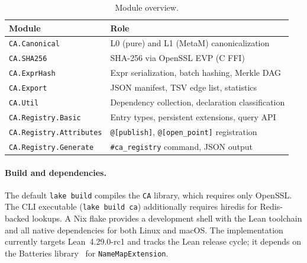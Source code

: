 \begin{table}[h]
\centering
\begin{tabular}{@{}ll@{}}
  \toprule
  \textbf{Module} & \textbf{Role} \\
  \midrule
  \texttt{CA.Canonical}           & L0 (pure) and L1 (MetaM) canonicalization \\
  \texttt{CA.SHA256}              & SHA-256 via OpenSSL EVP (C FFI) \\
  \texttt{CA.ExprHash}            & Expr serialization, batch hashing, Merkle DAG \\
  \texttt{CA.Export}              & JSON manifest, TSV edge list, statistics \\
  \texttt{CA.Util}                & Dependency collection, declaration classification \\
  \texttt{CA.Registry.Basic}      & Entry types, persistent extensions, query API \\
  \texttt{CA.Registry.Attributes} & \texttt{@[publish]}, \texttt{@[open\_point]} registration \\
  \texttt{CA.Registry.Generate}   & \texttt{\#ca\_registry} command, JSON output \\
  \bottomrule
\end{tabular}
\caption{Module overview.}
\label{tab:modules}
\end{table}

\paragraph{Build and dependencies.}  The default \texttt{lake build}
compiles the \texttt{CA} library, which requires only OpenSSL.  The CLI
executable (\texttt{lake build ca}) additionally requires hiredis for
Redis-backed lookups.  A Nix flake provides a development shell with the
Lean toolchain and all native dependencies for both Linux and macOS.
The implementation currently targets Lean~4.29.0-rc1 and tracks the
Lean release cycle; it depends on the Batteries
library~\cite{batteries} for \texttt{NameMapExtension}.



